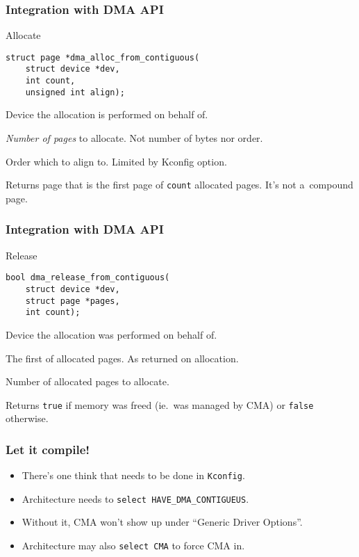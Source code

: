 \begin{frame}[fragile]
  \frametitle{Integration with DMA API}

  \begin{block}{Allocate}
\begin{lstlisting}
struct page *dma_alloc_from_contiguous(
    struct device *dev,
    int count,
    unsigned int align);
\end{lstlisting}
  \end{block}

  \begin{description}[count]
  \item[dev] Device the allocation is performed on behalf of.
  \item[count] \emph{Number of pages} to allocate. {\footnotesize Not
    number of bytes nor order.}
  \item[align] Order which to align to.  Limited by Kconfig option.
  \item Returns page that is the first page of \lstinline|count|
    allocated pages. {\footnotesize It's not a~compound page.}
  \end{description}
\end{frame}

\begin{frame}[fragile]
  \frametitle{Integration with DMA API}

  \begin{block}{Release}
\begin{lstlisting}
bool dma_release_from_contiguous(
    struct device *dev,
    struct page *pages,
    int count);
\end{lstlisting}
  \end{block}

  \begin{description}[count]
  \item[dev] Device the allocation was performed on behalf of.
  \item[pages] The first of allocated pages. {\footnotesize As
    returned on allocation.}
  \item[count] Number of allocated pages to allocate.
  \item Returns \lstinline|true| if memory was freed (ie.\ was managed
    by CMA) or \lstinline|false| otherwise.
  \end{description}
\end{frame}

\begin{frame}
  \frametitle{Let it compile!}

  \begin{itemize}
  \item There's one think that needs to be done in \lstinline|Kconfig|.
  \item Architecture needs to \lstinline|select HAVE_DMA_CONTIGUEUS|.
  \item Without it, CMA won't show up under “Generic Driver Options”.
  \item Architecture may also \lstinline|select CMA| to force CMA in.
  \end{itemize}
\end{frame}

